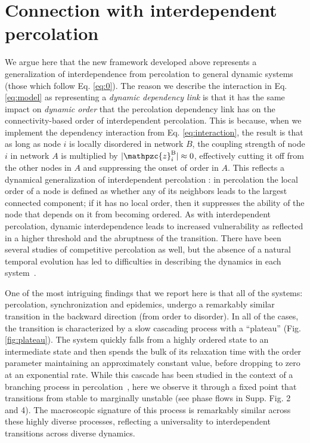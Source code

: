 \documentclass[pre,twocolumn,superscriptaddress]{revtex4}
\newcommand{\1}{\mathds{1}}
\begin{document}
{\section{Connection with interdependent percolation}
We argue here that the new framework developed above represents a generalization of interdependence from percolation to general dynamic systems (those which follow Eq. \eqref{eq:0}).
The reason we describe the interaction in Eq. \eqref{eq:model} as representing a \emph{dynamic dependency link} is that it has the same impact on  \emph{dynamic order} that the percolation dependency link has on the connectivity-based order of interdependent percolation.
This is because, when we implement the dependency interaction from Eq. \eqref{eq:interaction}, the result is that as long as node $i$ is locally disordered in network ${B}$,  the coupling strength of node $i$ in network $A$ is multiplied by $|\mathpzc{z}_i^\mathrm{B}|\approx0$, effectively cutting it off from the other nodes in $A$ and suppressing the onset of order in $A$.
This reflects a dynamical generalization of interdependent percolation \cite{buldyrev-nature2010}:  in percolation the local order of a node is defined as whether any of its neighbors leads to the largest connected component; if it has no local order, then it suppresses the ability of the node that depends on it from becoming ordered.
As with interdependent percolation, dynamic interdependence leads to increased vulnerability as reflected in a higher threshold and the abruptness of the transition.
There have been several studies of competitive percolation as well, but the absence of a natural temporal evolution has led to difficulties in describing the dynamics in each system~\cite{zhao-jstatmech2013,kotnis-pre2015,watanabe-pre2016}.

One of the most intriguing findings that we report here is that all of the systems: percolation, synchronization and epidemics, undergo a remarkably similar  transition in the backward direction (from order to disorder).  In all of the cases, the transition is characterized by a slow cascading process with a ``plateau'' (Fig. \ref{fig:plateau}).
The system quickly falls from a highly ordered state to an intermediate state and then spends the bulk of its relaxation time with the order parameter maintaining an approximately constant value, before dropping to zero at an exponential rate.
While this cascade has been studied in the context of a branching process in percolation~\cite{dong-pre2014,lee-pre2016}, here we observe it through a fixed point that transitions from stable to marginally unstable (see phase flows in Supp. Fig. 2 and 4).  The macroscopic signature of this process is remarkably similar across these highly diverse processes, reflecting a universality to interdependent transitions across diverse dynamics.


}
\end{document}
